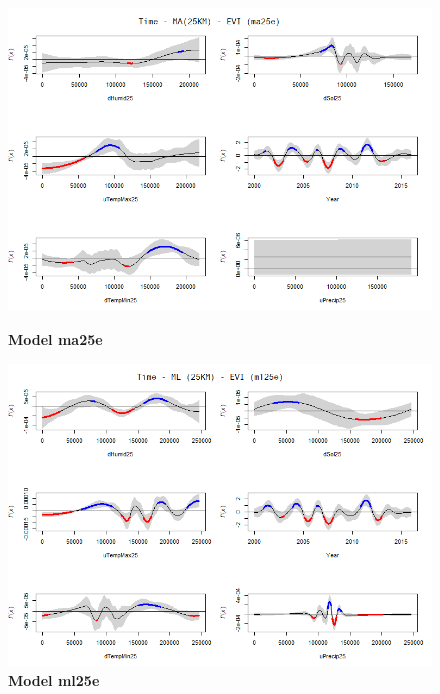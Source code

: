 \begin{figure}[H]
 \centering
    \begin{minipage}{0.8\textwidth}
        \centering
        \includegraphics[width=1.2\textwidth]{ma25e.png} %
        \caption{\textbf{Model ma25e}}
    \end{minipage}\hfill
    \begin{minipage}{0.8\textwidth}
        \centering
        \includegraphics[width=1.2\textwidth]{ml25e.png} %
        \caption{\textbf{Model ml25e}}
    \end{minipage}
\end{figure}

